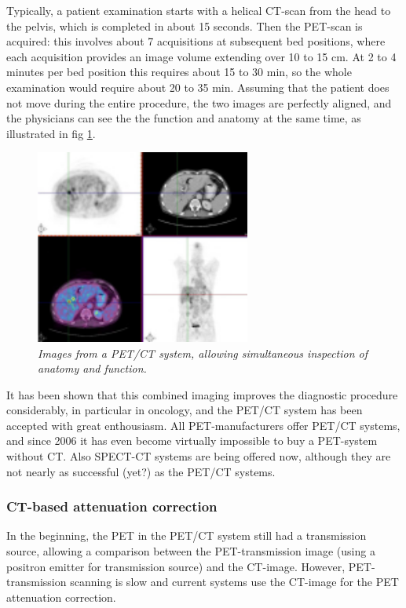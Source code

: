 \documentclass[11pt,oneside]{article}
\begin{document}
Typically, a patient examination starts with a helical CT-scan from the
head to the pelvis, which is completed in about 15 seconds. Then the
PET-scan is acquired: this involves about 7 acquisitions at subsequent
bed positions, where each acquisition provides an image volume
extending over 10 to 15 cm. At 2 to 4 minutes per bed position this
requires about 15 to 30 min, so the whole examination would require
about 20 to 35 min. Assuming that the patient does not move during the
entire procedure, the two images are perfectly aligned, and the
physicians can see the the function and anatomy at the same time, as
illustrated in fig \ref{fig:petctimg}.
%
\begin{figure}[tb]
\centering
\includegraphics[width=0.63\textwidth]{figs/fig_petctimg.pdf}
\caption{\label{fig:petctimg} \emph{Images from a PET/CT system, allowing
simultaneous inspection of anatomy and function.}}
\end{figure}

It has been shown that this combined imaging improves the diagnostic
procedure considerably, in particular in oncology, and the PET/CT
system has been accepted with great enthousiasm. All PET-manufacturers
offer PET/CT systems, and since 2006 it has even become virtually
impossible to buy a PET-system without CT. Also SPECT-CT systems are
being offered now, although they are not nearly as successful (yet?)
as the PET/CT systems.

\subsubsection{CT-based attenuation correction}
In the beginning, the PET in the PET/CT system still had a transmission
source, allowing a comparison between the PET-transmission image (using a
positron emitter for transmission source) and the CT-image. However,
PET-transmission scanning is slow and current systems use the CT-image for the
PET attenuation correction.
\end{document}
